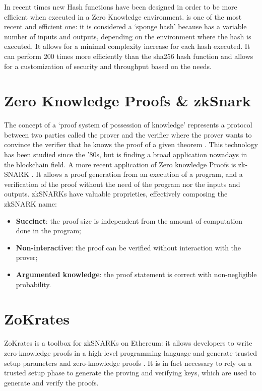 In recent times new Hash functions have been designed in order to be more efficient when executed in a Zero Knowledge environment. \cite{grassi_poseidon_2021} is one of the most recent and efficient one: it is considered a `sponge hash' because has a variable number of inputs and outputs, depending on the environment where the hash is executed. It allows for a minimal complexity increase for each hash executed. It can perform 200 times more efficiently than the sha256 hash function and allows for a customization of security and throughput based on the needs.

\section{Zero Knowledge Proofs \& zkSnark}

The concept of a `proof system of possession of knowledge' represents a protocol between two parties called the prover and the verifier where the prover wants to convince the verifier that he knows the proof of a given theorem \cite{de_santis_zero-knowledge_1992}. This technology has been studied since the '80s, but is finding a broad application nowadays in the blockchain field. A more recent application of Zero knowledge Proofs is zk-SNARK \cite{bitansky_extractable_2012}. It allows a proof generation from an execution of a program, and a verification of the proof without the need of the program nor the inputs and outputs. zkSNARKs have valuable proprieties, effectively composing the zkSNARK name:
\begin{itemize}
      \item \textbf{Succinct}: the proof size is independent from the amount of computation done in the program;
            \vspace{-0.11in}
      \item \textbf{Non-interactive}: the proof can be verified without interaction with the prover;
            \vspace{-0.11in}
      \item \textbf{Argumented knowledge}: the proof statement is correct with non-negligible probability.
            \vspace{-0.11in}
\end{itemize}

\section{ZoKrates}

ZoKrates is a toolbox for zkSNARKs on Ethereum: it allows developers to write zero-knowledge proofs in a high-level programming language and generate trusted setup parameters and zero-knowledge proofs \cite{eberhardt_ZoKrates_2018}. It is in fact necessary to rely on a trusted setup phase to generate the proving and verifying keys, which are used to generate and verify the proofs.


